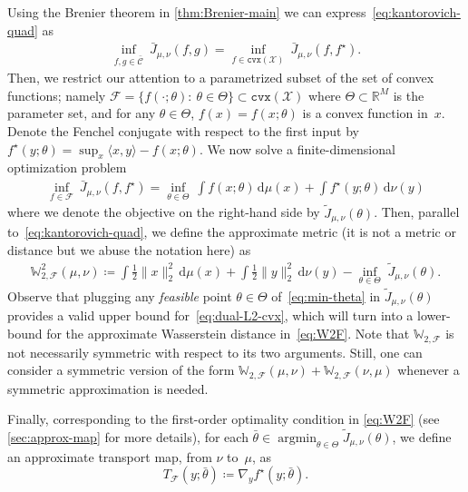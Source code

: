 \documentclass[10pt]{article}
\newcommand{\ud}{\,\mathrm{d}}
\newcommand{\norm}[1]{\|#1\|}
\renewcommand{\tilde}{\widetilde}
\newcommand{\cvx}{\mathtt{cvx}}
\newcommand{\real}{\mathbb{R}}
\newcommand{\argmin}{\mathop{\operatorname{argmin}}}
\newcommand{\W}{\mathds{W}}
\newcommand{\calC}{\mathcal{C}}
\newcommand{\calF}{\mathcal{F}}
\newcommand{\calX}{\mathcal{X}}
\numberwithin{equation}{section}
\begin{document}
Using the Brenier theorem in \autoref{thm:Brenier-main} \cite[Theorem~2.9]{villani2003topics} we can express~\eqref{eq:kantorovich-quad} as
\begin{align}\label{eq:dual-L2-cvx}
\inf_{f,g \in \bar{\calC}}~\bar{J}_{\mu,\nu} (f,g)=\inf_{f\in \cvx(\calX)} ~\bar{J}_{\mu,\nu}(f,f^\star).
\end{align}
Then, we restrict our attention to a parametrized subset of the set of convex functions; namely $\mathcal{F}= \{f(\cdot; \theta):~ \theta\in \Theta\} \subset \cvx(\calX)$ where $\Theta \subset \real^M$ is the parameter set, and for any $\theta \in \Theta$, $f(x) = f(x; \theta)$ is a convex function in~$x$. Denote the Fenchel conjugate with respect to the first input by $f^\star(y;\theta) = \sup_x \langle x, y\rangle - f(x;\theta)$. We now solve a finite-dimensional optimization problem
\begin{align}\label{eq:min-theta}
\inf_{f\in \calF}~\bar{J}_{\mu,\nu}(f,f^\star) =\inf_{\theta \in {\Theta} }~\int f(x;\theta)\ud \mu(x) + \int f^\star(y;\theta)\ud \nu(y)
\end{align} 
where we denote the objective on the right-hand side by ${\tilde{J}}_{\mu,\nu}(\theta)$. 
Then, parallel to~\eqref{eq:kantorovich-quad}, we define the approximate metric (it is not a metric or distance but we abuse the notation here) as
\begin{align}\label{eq:W2F}
\W_{2,\calF}^2 (\mu,\nu) \coloneqq 
\int \frac{1}{2}\norm{x}_2^2 \ud \mu(x) + \int \frac{1}{2}\norm{y}_2^2 \ud \nu(y) - \inf_{\theta\in\Theta} \;\tilde{J}_{\mu,\nu}(\theta) .
\end{align}
Observe that plugging any {\em feasible} point $\theta\in\Theta$ of~\eqref{eq:min-theta} in $\tilde{J}_{\mu,\nu}(\theta)$ provides a valid upper bound for~\eqref{eq:dual-L2-cvx}, which will turn into a lower-bound for the approximate Wasserstein distance in~\eqref{eq:W2F}. Note that $\W_{2,\calF}$ is not necessarily symmetric with respect to its two arguments. Still, one can consider a symmetric version of the form $\W_{2,\calF}(\mu,\nu) + \W_{2,\calF}(\nu,\mu)$ whenever a symmetric approximation is needed. 

Finally, corresponding to the first-order optimality condition in \eqref{eq:W2F} (see \autoref{sec:approx-map} for more details), for each $\bar{\theta}\in \argmin_{\theta\in\Theta} \tilde{J}_{\mu,\nu}(\theta)$, we 
define an approximate transport map, from $\nu$ to~$\mu$, as
\begin{equation}\label{eq:approx-opt-map}
T_{\calF}(y;\bar{\theta}) \coloneqq \nabla_y f^\star(y;\bar{\theta}).
\end{equation}
\end{document}
